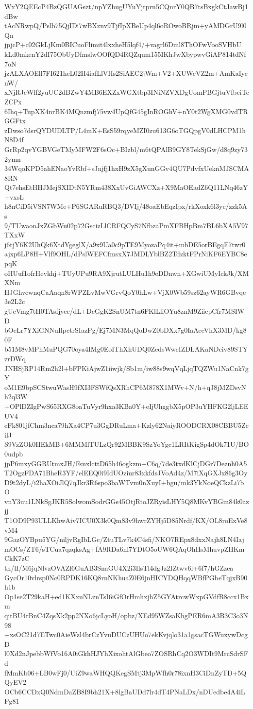 WxY2QEEcP4BzQGUAGszt/npYZbugUYuYjtprn5CQnrY0QB7tsBxgkCtJawBj1dBw
tAcNRwpQ/Pslb75QjIDi7wBXznv9TjfIpXBeUp4ql6oROwoBRjm+yAMDGrU9l0Qn
jpjcP+c02GkLjKm0BICuoFlimit4lxxheH5lqf4/+vagrl6Dml8ThOFwVooSVHbU
kLd0mkenY2dI75ObUyDfmslwOOfQD4RQZqum155IKhJwXbypwvGiAP814tdNf7oN
jzALXAOEll7FI621heL02H4iafLlVHs2SiAEC2jWm+V2+XUWcVZ2m+AmKaIyenW/
xNjRJcWlf2yuUC2dBZwY4MB6EXZxWGXtbp3INiNZVXDgUomPBGjtuVfbciTeZCPx
6Ihq+TupXK4nrBK4MQnzmfj75vw4UpQfG45gInROGhV+nY0t2WgXMG0vdTRGGFtx
zDwso7dsrQYDUDLTP/L4mK+EsS59rqyeMZI0zu613G6oTGQpgV0dLHCPM1hN8D4f
GrRp2qvYGBVGeTMyMFW2F6sOc+BIzbl/m6tQPAlB9GY8TekSjGw/d8q9zy732ymn
34WqoKPD5ahENaoYvRbf+sJnjfj1hxH9zX5gXunGGv4QU7PdvfxUeknMJSCMA8RN
Qt7ehsEtHHJMejSXIDtN5YRm438XxUvGiAWCXz+X9MaOEadZ6Q11LNq46zY+vxsL
h8nCiD5iVSN7WMe+P6SGARuRBQ3/DVIj/48oaEbEqzIpx/rkXoxk6l3yc/zzk5As
9/TUwaonJxZGbWu02p72GscizLlCRFQCyS7NfbzaPmXFBHpBm7BL6bXA5V97TXxW
j6tjY6K2UhQk6XtdYgeglX/a9x9Ua0c9pTE9MyozaPq4it+mbDE5orBEgqE7twr0
ajxp6LP8H+Vlf9OHL/dPslWEFCfmsxX7JMDLYblBZ2TdzktFPrNiKF6EYBC8epqK
oHUuf1ofrHevkhj+TUyUPu9RA9XjrutLULHu1h9eDDnwn+XGwiUMyIckJk/XMXNm
HJGhvewnqCaAaqn8rWPZLvMwVGrvQoY0hLw+VjX0Wb59sz62ayWR6GBvqe3e2L2c
gUcVmg7tH0TAsfjyee/dL+DcGgK2SnUM7tn6FKlLliOYu8znM9ZiiepCfr7MSIWD
bOeLr7YXiGNNuIlpctrSIazPg/Ej7MN3MqQoDwZ0bDXx7g0IaAeeVhX3MD/kg80F
b51M8vMPhMuPQG70oya4IMg0EoIThXhUDQ0ZedsWwcIZDLAKaNDciv89STYzrDWq
JNHSjRP14Rm2h2l+bFPKiAjwZ1iiwjk/Sb1m/iw88s9wqVqLjqTQZWu1NaCnk7gY
oM1E9bpSCStwuWasH9fXI3FSWfQsXRhCP6M878X1MWv+N/h+qJ8jMZDsvNh2ql3W
+OPlDZIgPwS65RXG8oaTuVyr9hxa3KBa0Y+eIjUhggbX5pOP3uYHFKG2ljLEEUV4
eFk801jfChm3nca79hXa4CP7u3GgDRuLma+Kzly62NaiyROODCRX08CBBU5ZcilJ
S9VzZOk0HEkMB+6MMMlTULzQr92MBBK9SzYoYgc1LRItKigSp4dOk71U/BO0udpb
jpP6mxyGGRUtmxJH/FsnxlcttD65h46ogkzm+C6q/7de3txdKlCjDGr7Deznh0A5
T2OgzFDA71BheR3YF/elEEQ0i9IdUOziur83xkfdsJVoAd4z/M7iXqGXJx86g3Oy
D9t2dyL/i2haXOiJlQ7qJkr3R6spo3baWTvm0nXuyI+bgu/mk3YkNoeQCkzLi7bO
vnY3uu1LNkSgJKR5SolwomSodrGGs45OtjRtoJZRyisLHY5Q8MKvYBGm84k0azjj
T1OD9P93ULLKhwAiv7ICU0X3k0Qm83v9hwrZYHj5D85Nrdf/KX/OL8roExVe8vM4
9GazOYBpu5YG/niljvRgIbLGc/ZtuTLv7k4C4sfi/NKO7REpx8dxxNajh8LN4Iaj
mOCs/ZT6/sTCua7qzqksAg+fA9RDa6nl7YDtO5oUW6QAqOhHsMhuvpZHKmCkK7zC
th/lI/M6jqNlvzOVAZl6GuAB3SnaGU4X2i3IlsTl4dgJz2IZtwv6l+6f7/hGZzea
GycOr10vlrsp0Nc0RPDK16KQ8rnNKhuaZ0E6jnHICYDQHqqWBfPGbeTqjxB90h1b
Op1se2T29kaH+ed1KXxuNLznTsI6iGfOrHmhxjhZ5GYAtrcwWxpGVdfB8ccx1Bxm
qitBU4rBnC4ZqsXk2pp2NXo6jcLyoH/opbz/XEd95WZsaKhgPER6mA3B3C3o3N98
+xsOC21d7ETwc0AieWzl4brCzYvuDUCzUHUo7ekKvjqlo31a1gsacTGWuxywDcgD
l0Xd2nJpebbWfVo16A0iGkhHJYhXixohtAlGbeo7ZOSRhCq2O3WDIt9MrcSdrSFd
fMmKb06+LB0wFj0/UiZ9waWHQQKegSMtj3MpWfh0r78ixnH3CiDnZyTD+5QQyEV2
OCb6CCDxQ0NdmDaZB8I9bh21X+8lgBaUDd7lr4dT4PNaLDx/nDUedbe4A4iLPg81
